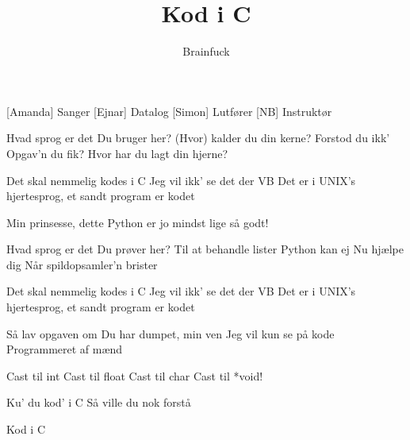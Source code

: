 \documentclass[a4paper,11pt]{article}
\title{Kod i C}
\author{Brainfuck}
\begin{document}
\maketitle

\begin{roles}
  [Amanda] Sanger
  [Ejnar] Datalog
  [Simon] Lutfører
  [NB] Instruktør
\end{roles}

\begin{song}





   Hvad sprog er det
  Du bruger her?
  (Hvor) kalder du din kerne?
  Forstod du ikk'
  Opgav'n du fik?
  Hvor har du lagt din hjerne?

   Det skal nemmelig kodes i C
  Jeg vil ikk' se det der VB
  Det er i UNIX's hjertesprog, et sandt program er kodet

   Min prinsesse, dette Python er jo mindst lige så godt!

   Hvad sprog er det
  Du prøver her?
  Til at behandle lister
  Python kan ej
  Nu hjælpe dig
  Når spildopsamler'n brister

   Det skal nemmelig kodes i C
  Jeg vil ikk' se det der VB
  Det er i UNIX's hjertesprog, et sandt program er kodet



   Så lav opgaven om
  Du har dumpet, min ven
  Jeg vil kun se på kode
  Programmeret af mænd

   Cast til int
  Cast til float
  Cast til char
  Cast til *void!

   Ku' du kod' i C
  Så ville du nok forstå

   Kod i C


\end{song}
\end{document}
